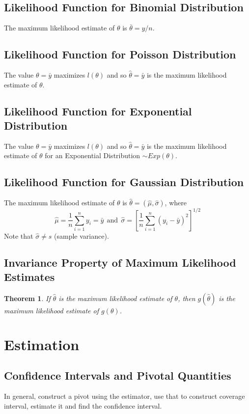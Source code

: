 \documentclass[12pt, leqno]{article}
\theoremstyle{definition}
\newtheorem*{theorem}{Theorem}
\begin{document}
  \subsection{Likelihood Function for Binomial Distribution}
  The maximum likelihood estimate of $\theta$ is $\bar{\theta} = y / n$.

  \subsection{Likelihood Function for Poisson Distribution}
  The value $\theta = \bar{y}$ maximizes $l(\theta)$ and so $\hat{\theta} = \bar{y}$ is the maximum likelihood estimate of $\theta$.

  \subsection{Likelihood Function for Exponential Distribution}
  The value $\theta = \bar{y}$ maximizes $l(\theta)$ and so $\hat{\theta} = \bar{y}$ is the maximum likelihood estimate of $\theta$ for an Exponential Distribution $\sim Exp(\theta)$.

  \subsection{Likelihood Function for Gaussian Distribution}
  The maximum likelihood estimate of $\theta$ is $\hat{\theta} = (\hat{\mu}, \hat{\sigma})$, where
  $$
  \hat{\mu} = \frac{1}{n}\sum_{i=1}^{n}y_{i} = \bar{y}
  ~~\text{and}~~
  \hat{\sigma} = \left[\frac{1}{n}\sum_{i=1}^{n}(y_{i} - \bar{y})^{2}\right]^{1/2}
  $$
  Note that $\hat{\sigma} \not = s$ (sample variance).

  \subsection{Invariance Property of Maximum Likelihood Estimates}
  \begin{theorem}
    \emph{If $\hat{\theta}$ is the maximum likelihood estimate of $\theta$, then $g(\hat{\theta})$ is the maximum likelihood estimate of $g(\theta)$.}
  \end{theorem}
  \newpage
  \section{Estimation}
  \subsection{Confidence Intervals and Pivotal Quantities}
  In general, construct a pivot using the estimator, use that to construct coverage interval, estimate it and find the confidence interval.
\end{document}
